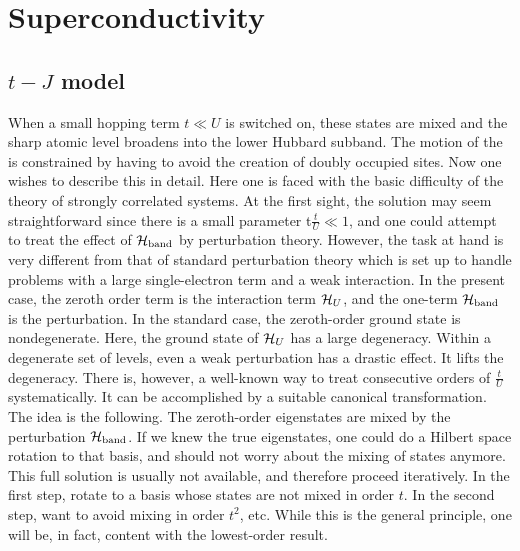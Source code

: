 \chapter{Superconductivity}

	\section{$t-J$ model}

		When a small hopping term $t\ll U$ is switched on, these states are mixed and the sharp atomic level broadens into the lower Hubbard subband. The motion of the \electron is constrained by having to avoid the creation of doubly occupied sites. Now one wishes to describe this in detail. Here one is faced with the basic difficulty of the theory of strongly correlated systems. At the ﬁrst sight, the solution may seem straightforward since there is a small parameter t$\frac t U \ll 1$, and one could attempt to treat the eﬀect of $\mathcal H_\text{band}$ by perturbation theory. However, the task at hand is very different from that of standard perturbation theory which is set up to handle problems with a large single-electron term and a weak interaction. In the present case, the zeroth order term is the interaction term $\mathcal H_U$, and the one-\electron term $\mathcal H_\text{band}$ is the perturbation. In the standard case, the zeroth-order ground state is nondegenerate. Here, the ground state of $\mathcal H_U$ has a large degeneracy. Within a degenerate set of levels, even a weak perturbation has a drastic effect. It lifts the degeneracy. There is, however, a well-known way to treat consecutive orders of $\frac t U$ systematically. It can be accomplished by a suitable canonical transformation. The idea is the following. The zeroth-order eigenstates are mixed by the perturbation $\mathcal H_\text{band}$. If we knew the true eigenstates, one could do a Hilbert space rotation to that basis, and should not worry about the mixing of states anymore. This full solution is usually not available, and therefore proceed iteratively. In the ﬁrst step, rotate to a basis whose states are not mixed in order $t$. In the second step, want to avoid mixing in order $t^2$, etc. While this is the general principle, one will be, in fact, content with the lowest-order result.


